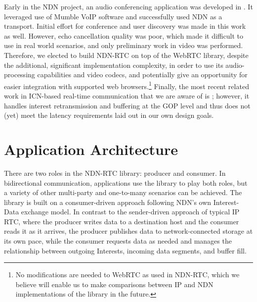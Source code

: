 \documentclass{icn/sig-alternate-2013} %
\newcommand{\ndnrtcName}{NDN-RTC} %
\begin{document}
Early in the NDN project, an audio conferencing application was developed in \cite{act-tool}. It leveraged use of Mumble VoIP software and successfully used NDN as a transport.  Initial effort for conference and user discovery was made in this work as well. %
However, echo cancellation quality was poor, which made it difficult to use in real world scenarios, and only preliminary work in video was performed. Therefore, we elected to build \ndnrtcName{} on top of the WebRTC library, despite the additional, significant implementation complexity, in order to use its audio-processing capabilities and video codecs, and potentially give an opportunity for easier integration with supported web browsers.\footnote{No  modifications are needed to WebRTC as used in \ndnrtcName{}, which we believe will enable us to make comparisons between IP and NDN implementations of the library in the future.}  Finally, the most recent related work in ICN-based real-time communication that we are aware of is \cite{huawei-rtc}; however, it handles interest retransmission and buffering at the GOP level and thus does not (yet) meet the latency requirements laid out in our own design goals. 


\section{Application Architecture}
\label{sec:arch}

There are two roles in the \ndnrtcName{} library: producer and consumer.  In bidirectional communication, applications use the library to play both roles, but a variety of other multi-party and one-to-many scenarios can be achieved.  The library is built on a consumer-driven approach following NDN's own Interest-Data exchange model.  In contrast to the sender-driven approach of typical IP RTC, where the producer writes data to a destination host and the consumer reads it as it arrives, the producer publishes data to network-connected storage at its own pace, while the consumer requests data as needed and manages the relationship between outgoing Interests, incoming data segments, and buffer fill. 
%
\end{document}
